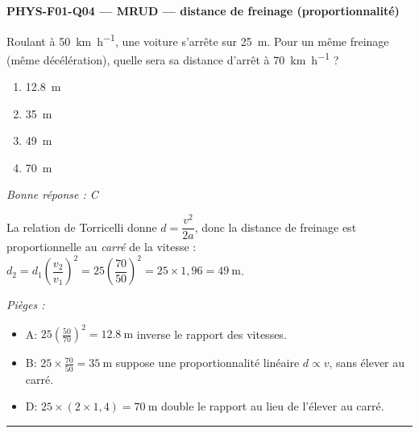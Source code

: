 \documentclass[11pt,a4paper]{article}
\begin{document}
\noindent\textbf{PHYS-F01-Q04 --- MRUD --- distance de freinage (proportionnalité)}\par
Roulant à \qty{50}{\kilo\metre\per\hour}, une voiture s'arrête sur \qty{25}{\metre}. Pour un même freinage (même décélération), quelle sera sa distance d'arrêt à \qty{70}{\kilo\metre\per\hour} ?
\begin{enumerate}[label=\Alph*)]
\item \qty{12.8}{\metre}
\item \qty{35}{\metre}
\item \qty{49}{\metre}
\item \qty{70}{\metre}
\end{enumerate}
\textit{Bonne réponse : C}\par
La relation de Torricelli donne $d=\dfrac{v^2}{2a}$, donc la distance de freinage est proportionnelle au \emph{carré} de la vitesse : $d_2=d_1\left(\dfrac{v_2}{v_1}\right)^2=25\left(\dfrac{70}{50}\right)^2=25\times 1{,}96=\qty{49}{\metre}$.\par
\textit{Pièges :}
\begin{itemize}
\item A: $25\left(\frac{50}{70}\right)^2=\qty{12.8}{\metre}$ inverse le rapport des vitesses.
\item B: $25\times\frac{70}{50}=\qty{35}{\metre}$ suppose une proportionnalité linéaire $d\propto v$, sans élever au carré.
\item D: $25\times(2\times 1{,}4)=\qty{70}{\metre}$ double le rapport au lieu de l'élever au carré.
\end{itemize}
\vspace{8pt}\hrule\vspace{8pt}
\end{document}
